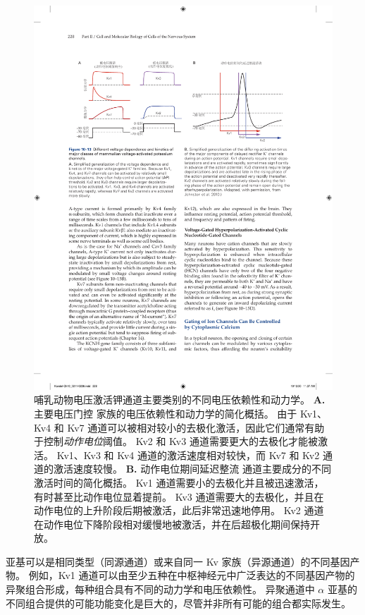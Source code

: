 \begin{figure}[htbp]
	\centering
	\includegraphics[width=1.0\linewidth]{chap10/fig_10_13}
	\caption{哺乳动物电压激活钾通道主要类别的不同电压依赖性和动力学。
		\textbf{A.} 主要电压门控  家族的电压依赖性和动力学的简化概括。
		由于 Kv1、Kv4 和 Kv7 通道可以被相对较小的去极化激活，因此它们通常有助于控制\textit{动作电位}阈值。
		Kv2 和 Kv3 通道需要更大的去极化才能被激活。
		Kv1、Kv3 和 Kv4 通道的激活速度相对较快，而 Kv7 和 Kv2 通道的激活速度较慢。
		\textbf{B.} 动作电位期间延迟整流  通道主要成分的不同激活时间的简化概括。
		Kv1 通道需要小的去极化并且被迅速激活，有时甚至比动作电位显着提前。
		Kv3 通道需要大的去极化，并且在动作电位的上升阶段后期被激活，此后非常迅速地停用。
		Kv2 通道在动作电位下降阶段相对缓慢地被激活，并在后超极化期间保持开放\cite{johnston2010symposium}。}
	\label{fig:10_13}
\end{figure}


亚基可以是相同类型（同源通道）或来自同一 Kv 家族（异源通道）的不同基因产物。
例如，Kv1 通道可以由至少五种在中枢神经元中广泛表达的不同基因产物的异聚组合形成，每种组合具有不同的动力学和电压依赖性。
异聚通道中 $\alpha$ 亚基的不同组合提供的可能功能变化是巨大的，尽管并非所有可能的组合都实际发生。


